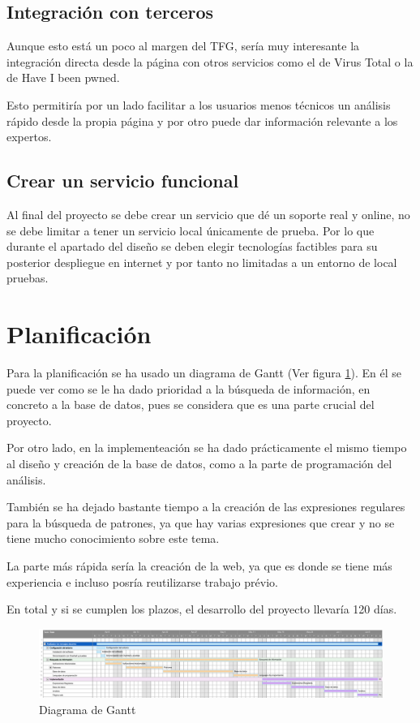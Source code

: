 \subsection{Integración con terceros}
Aunque esto está un poco al margen del TFG, sería muy interesante la integración directa desde la página con otros servicios como el de Virus Total o la de Have I been pwned.

Esto permitiría por un lado facilitar a los usuarios menos técnicos un análisis rápido desde la propia página y por otro puede dar información relevante a los expertos.

\subsection{Crear un servicio funcional}
Al final del proyecto se debe crear un servicio que dé un soporte real y online, no se debe limitar a tener un servicio local únicamente de prueba. Por lo que durante el apartado del diseño se deben elegir tecnologías factibles para su posterior despliegue en internet y por tanto no limitadas a un entorno de local pruebas.

\section{Planificación}
Para la planificación se ha usado un diagrama de Gantt (Ver figura \ref{fig:Gantt}).
En él se puede ver como se le ha dado prioridad a la búsqueda de información, en concreto a la base de datos, pues se considera que es una parte crucial del proyecto. 

Por otro lado, en la implementeación se ha dado prácticamente el mismo tiempo al diseño y creación de la base de datos, como a la parte de programación del análisis. 

También se ha dejado bastante tiempo a la creación de las expresiones regulares para la búsqueda de patrones, ya que hay varias expresiones que crear y no se tiene mucho conocimiento sobre este tema. 

La parte más rápida sería la creación de la web, ya que es donde se tiene más experiencia e incluso posría reutilizarse trabajo prévio. 

En total y si se cumplen los plazos, el desarrollo del proyecto llevaría 120 días. 

\begin{figure}[htb]
    \centering
    \includegraphics[width=\textwidth]{imagenes/Diagrama_Gann.png}
\caption{Diagrama de Gantt}
\label{fig:Gantt}
\end{figure}

